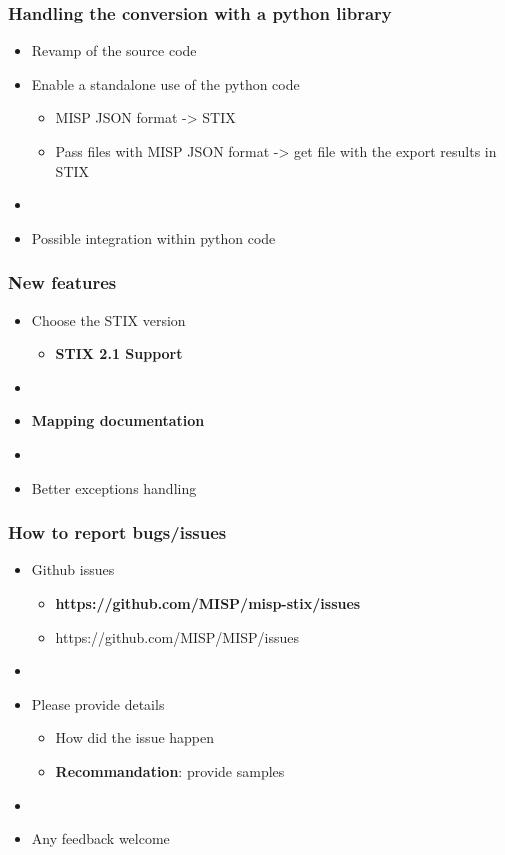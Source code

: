 \begin{frame}
    \frametitle{Handling the conversion with a python library}
    \begin{itemize}
        \item Revamp of the source code
        \item Enable a standalone use of the python code
        \begin{itemize}
            \item MISP JSON  format -> STIX
            \item Pass files with MISP JSON format -> get file with the export results in STIX
        \end{itemize}
        \item []
        \item Possible integration within python code
    \end{itemize}
\end{frame}

\begin{frame}
    \frametitle{New features}
    \begin{itemize}
        \item Choose the STIX version
        \begin{itemize}
            \item {\bf STIX 2.1 Support}
        \end{itemize}
        \item []
        \item {\bf Mapping documentation}
        \item []
        \item Better exceptions handling
    \end{itemize}
\end{frame}

\begin{frame}
    \frametitle{How to report bugs/issues}
    \begin{itemize}
        \item Github issues
        \begin{itemize}
            \item {\bf https://github.com/MISP/misp-stix/issues}
            \item https://github.com/MISP/MISP/issues
        \end{itemize}
        \item []
        \item Please provide details
        \begin{itemize}
            \item How did the issue happen
            \item {\bf Recommandation}: provide samples
        \end{itemize}
        \item[]
        \item Any feedback welcome
    \end{itemize}
\end{frame}

